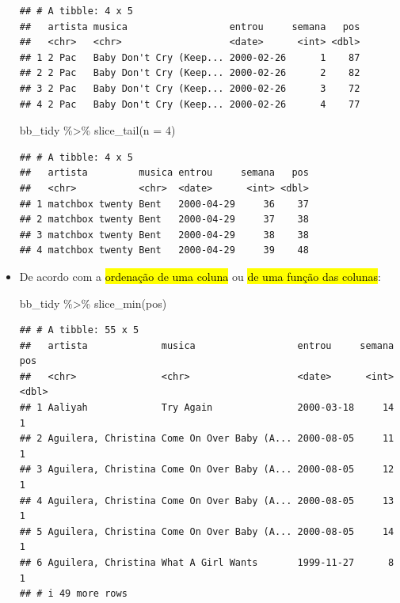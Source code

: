 \documentclass[
  11pt]{report}
\newenvironment{Shaded}{\begin{snugshade}}{\end{snugshade}}
\newcommand{\AttributeTok}[1]{\textcolor[rgb]{0.77,0.63,0.00}{#1}}
\newcommand{\DecValTok}[1]{\textcolor[rgb]{0.00,0.00,0.81}{#1}}
\newcommand{\FunctionTok}[1]{\textcolor[rgb]{0.00,0.00,0.00}{#1}}
\newcommand{\NormalTok}[1]{#1}
\newcommand{\SpecialCharTok}[1]{\textcolor[rgb]{0.00,0.00,0.00}{#1}}
\renewenvironment{Shaded}{
    \begin{mdframed}[%
      roundcorner=2pt,%
      innerleftmargin=5pt,%
      innerrightmargin=5pt,%
      topline=true,%
      leftline=true,%
      rightline=true,%
      bottomline=true,%
      linewidth=0.5pt,%
      linecolor=black!20,%
      backgroundcolor=black!2,%
      skipabove=2ex,%
      skipbelow=2.5ex%
    ]%
  }
  {
    \end{mdframed}
  }
\begin{document}
\begin{itemize}
\begin{verbatim}
## # A tibble: 4 x 5
##   artista musica                  entrou     semana   pos
##   <chr>   <chr>                   <date>      <int> <dbl>
## 1 2 Pac   Baby Don't Cry (Keep... 2000-02-26      1    87
## 2 2 Pac   Baby Don't Cry (Keep... 2000-02-26      2    82
## 3 2 Pac   Baby Don't Cry (Keep... 2000-02-26      3    72
## 4 2 Pac   Baby Don't Cry (Keep... 2000-02-26      4    77
\end{verbatim}

\begin{Shaded}
\begin{Highlighting}[]
\NormalTok{bb\_tidy }\SpecialCharTok{\%\textgreater{}\%} 
  \FunctionTok{slice\_tail}\NormalTok{(}\AttributeTok{n =} \DecValTok{4}\NormalTok{)}
\end{Highlighting}
\end{Shaded}

\begin{verbatim}
## # A tibble: 4 x 5
##   artista         musica entrou     semana   pos
##   <chr>           <chr>  <date>      <int> <dbl>
## 1 matchbox twenty Bent   2000-04-29     36    37
## 2 matchbox twenty Bent   2000-04-29     37    38
## 3 matchbox twenty Bent   2000-04-29     38    38
## 4 matchbox twenty Bent   2000-04-29     39    48
\end{verbatim}
\item
  De acordo com a {\hl{ordenação de uma coluna}} ou {\hl{de uma função das colunas}}:

\begin{Shaded}
\begin{Highlighting}[]
\NormalTok{bb\_tidy }\SpecialCharTok{\%\textgreater{}\%} 
  \FunctionTok{slice\_min}\NormalTok{(pos)}
\end{Highlighting}
\end{Shaded}

\begin{verbatim}
## # A tibble: 55 x 5
##   artista             musica                  entrou     semana   pos
##   <chr>               <chr>                   <date>      <int> <dbl>
## 1 Aaliyah             Try Again               2000-03-18     14     1
## 2 Aguilera, Christina Come On Over Baby (A... 2000-08-05     11     1
## 3 Aguilera, Christina Come On Over Baby (A... 2000-08-05     12     1
## 4 Aguilera, Christina Come On Over Baby (A... 2000-08-05     13     1
## 5 Aguilera, Christina Come On Over Baby (A... 2000-08-05     14     1
## 6 Aguilera, Christina What A Girl Wants       1999-11-27      8     1
## # i 49 more rows
\end{verbatim}


\end{itemize}
\end{document}
